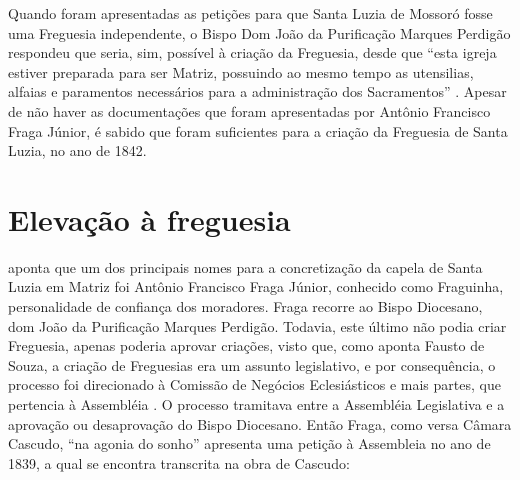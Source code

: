 \begin{refsection}
    Quando foram apresentadas as petições para que Santa Luzia de Mossoró fosse uma Freguesia independente, o Bispo Dom João da Purificação Marques Perdigão respondeu que seria, sim, possível à criação da Freguesia, desde que ``esta igreja estiver preparada para ser Matriz, possuindo ao mesmo tempo as utensilias, alfaias e paramentos necessários para a administração dos Sacramentos'' \cite[p.~62]{Cascudo2010Notas}. Apesar de não haver as documentações que foram apresentadas por Antônio Francisco Fraga Júnior, é sabido que foram suficientes para a criação da Freguesia de Santa Luzia, no ano de 1842.

    \section{Elevação à freguesia}

    \textcite{Cascudo2010Notas} aponta que um dos principais nomes para a concretização da capela de Santa Luzia em Matriz foi Antônio Francisco Fraga Júnior, conhecido como Fraguinha, personalidade de confiança dos moradores. Fraga recorre ao Bispo Diocesano, dom João da Purificação Marques Perdigão. Todavia, este último não podia criar Freguesia, apenas poderia aprovar criações, visto que, como aponta Fausto de Souza, a criação de Freguesias era um assunto legislativo, e por consequência, o processo foi direcionado à Comissão de Negócios Eclesiásticos e mais partes, que pertencia à Assembléia \cite[p.~50]{Cascudo2010Notas}. O processo tramitava entre a Assembléia Legislativa e a aprovação ou desaprovação do Bispo Diocesano. Então Fraga, como versa Câmara Cascudo, ``na agonia do sonho'' \cite[p.~51]{Cascudo2010Notas} apresenta uma petição à Assembleia no ano de 1839, a qual se encontra transcrita na obra de Cascudo:


\end{refsection}
